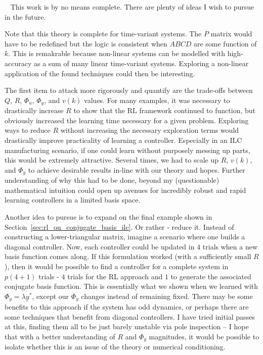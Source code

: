 ~\label{sec:future_work}
This work is by no means complete. There are plenty of ideas I wish to pursue in the future.

Note that this theory is complete for time-variant systems. The $P$ matrix would have to be redefined but the logic is consistent when $ABCD$ are some function of $k$. This is remakrable because non-linear systems can be modelled with high-accuracy as a sum of many linear time-variant systems. Exploring a non-linear application of the found techniques could then be interesting.

The first item to attack more rigorously and quantify are the trade-offs between $Q$, $R$, $\Phi_u$, $\Phi_y$, and $v(k)$ values. For many examples, it was necessary to drastically increase $R$ to show that the RL framework continued to function, but obviously increased the learning time necessary for a given problem. Exploring ways to reduce $R$ without increasing the necessary exploration terms would drastically improve practicality of learning a controller. Especially in an ILC manufacturing scenario, if one could learn without purposely messing up parts, this would be extremely attractive. Several times, we had to scale up $R$, $v(k)$, and $\Phi_y$ to achieve desirable results in-line with our theory and hopes. Further understanding of why this had to be done, beyond my (questionable) mathematical intuition could open up avenues for incredibly robust and rapid learning controllers in a limited basis space.

Another idea to pursue is to expand on the final example shown in Section~\ref{sec:rl_on_conjugate_basis_ilc}. 
Or rather - reduce it. Instead of constructing a lower-triangular matrix, imagine a scenario where one builds a diagonal controller. Now, each controller could be updated in $4$ trials when a new basis function comes along. If this formulation worked (with a sufficiently small $R$), then it would be possible to find a controller for a complete system in $p(4 + 1)$ trials - $4$ trials for the RL approach and $1$ to generate the associated conjugate basis function. This is essentially what we shown when we learned with $\Phi_y = \lambda \underline{y}^\ast$, except our $\Phi_y$ changes instead of remaining fixed. There may be some benefits to this approach if the system has odd dynamics, or perhaps there are some techniques that benefit from diagonal controllers. I have tried initial passes at this, finding them all to be just barely unstable via pole inspection -- I hope that with a better understanding of $R$ and $\Phi_y$ magnitudes, it would be possible to isolate whether this is an issue of the theory or numerical conditioning.

